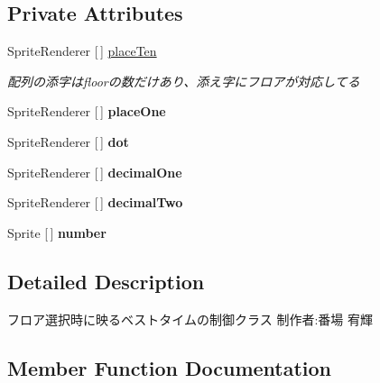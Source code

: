 \subsection*{Private Attributes}
\begin{DoxyCompactItemize}
\item 
Sprite\+Renderer \mbox{[}$\,$\mbox{]} \hyperlink{class_floor_best_time_num_sprite_ac71de1c29afcebc316d09e1755fb2114}{place\+Ten}
\begin{DoxyCompactList}\small\item\em 配列の添字はfloorの数だけあり、添え字にフロアが対応してる \end{DoxyCompactList}\item 
\mbox{\label{class_floor_best_time_num_sprite_a6b9b3fc573146094f4951b2f5ffb9ca4}} 
Sprite\+Renderer \mbox{[}$\,$\mbox{]} {\bfseries place\+One}
\item 
\mbox{\label{class_floor_best_time_num_sprite_a44e273b6ed7de870e03e80ccbfa55763}} 
Sprite\+Renderer \mbox{[}$\,$\mbox{]} {\bfseries dot}
\item 
\mbox{\label{class_floor_best_time_num_sprite_a14eb9eee09a3a5af73e23484b291e45c}} 
Sprite\+Renderer \mbox{[}$\,$\mbox{]} {\bfseries decimal\+One}
\item 
\mbox{\label{class_floor_best_time_num_sprite_aa97bb18fc1c48f20f30879480985702b}} 
Sprite\+Renderer \mbox{[}$\,$\mbox{]} {\bfseries decimal\+Two}
\item 
\mbox{\label{class_floor_best_time_num_sprite_a4a0e9aa6cbfe8d0960173ea3ff5eac57}} 
Sprite \mbox{[}$\,$\mbox{]} {\bfseries number}
\end{DoxyCompactItemize}


\subsection{Detailed Description}
フロア選択時に映るベストタイムの制御クラス 制作者\+:番場 宥輝 



\subsection{Member Function Documentation}
\mbox{\label{class_floor_best_time_num_sprite_a6f427325ec7edcba5afd25ee56b793ac}} 
